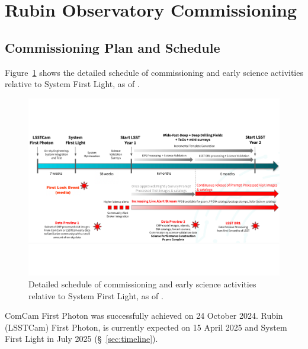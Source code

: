 \section{Rubin Observatory Commissioning}
\label{sec:commissioning}

\subsection{Commissioning Plan and Schedule}
\label{ssec:commissioning-schedule}

Figure~\ref{fig:commissioning-es-schedule} shows the detailed schedule of commissioning and early science activities relative to System First Light, as of \currentdate.
\begin{figure}[htb]
\centering
\includegraphics[width=0.98\linewidth]{figures/rubinobs_on-sky_commissioning_and_early_science}
\caption{Detailed schedule of commissioning  and early science activities relative to System First Light, as of \currentdate.}
\label{fig:commissioning-es-schedule}
\vspace{0.1cm}
\end{figure}
ComCam First Photon was successfully achieved on 24 October 2024.
Rubin (LSSTCam) First Photon, is currently expected on 15 April 2025 and System First Light in  July 2025 (\S~\ref{sec:timeline}). 

